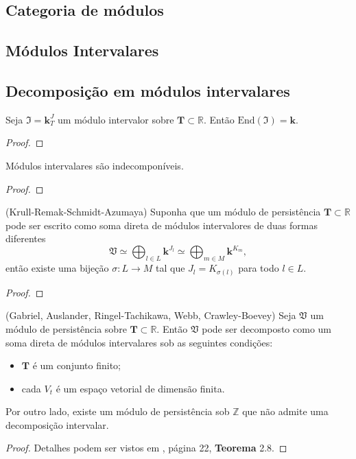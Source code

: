 \subsection{Categoria de módulos}

\subsection{Módulos Intervalares}

\subsection{Decomposição em módulos intervalares} 

\begin{propo}
    Seja $\mathfrak{I} = \mathbf{k}^J_T$ um módulo intervalor sobre $\mathbf{T} \subset \mathbb{R}$. 
    Então $\text{End}(\mathfrak{I}) = \mathbf{k}$. 
\end{propo}
\begin{proof}

\end{proof}

\begin{propo}
    Módulos intervalares são indecomponíveis. 
\end{propo}
\begin{proof}

\end{proof}

\begin{teo}{(Krull-Remak-Schmidt-Azumaya)}
    Suponha que um módulo de persistência $\mathbf{T} \subset \mathbb{R}$ pode ser escrito como soma 
    direta de módulos intervalores de duas formas diferentes
    \begin{equation*}
        \mathfrak{V} \simeq \bigoplus_{l \in L} \mathbf{k}^{J_l} \simeq \bigoplus_{m \in M} \mathbf{k}^{K_m},
    \end{equation*}
    então existe uma bijeção $\sigma \colon L \to M$ tal que $J_l = K_{\sigma(l)}$ para todo $l \in L$. 
\end{teo}
\begin{proof}

\end{proof}

\begin{teo}{(Gabriel, Auslander, Ringel-Tachikawa, Webb, Crawley-Boevey)}
    Seja $\mathfrak{V}$ um módulo de persistência sobre $\mathbf{T} \subset \mathbb{R}$. Então $\mathfrak{V}$
    pode ser decomposto como um soma direta de módulos intervalares sob as seguintes condições:
    \begin{itemize} 
        \item $\mathbf{T}$ é um conjunto finito;
        \item cada $V_t$ é um espaço vetorial de dimensão finita. 
    \end{itemize}
    Por outro lado, existe um módulo de persistência sob $\mathbb{Z}$ que não admite uma decomposição intervalar. 
\end{teo}  
\begin{proof}
    Detalhes podem ser vistos em \cite{Chazal2016}, página 22, \textbf{Teorema} 2.8.
\end{proof}

